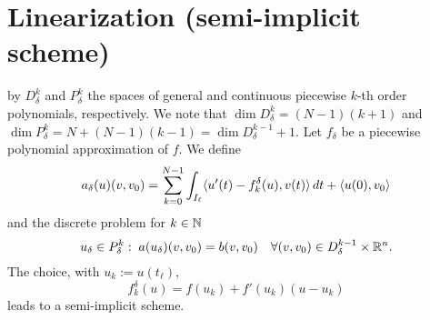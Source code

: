 \documentclass[english,12pt,a4paper]{article}
\begin{document}
%
%
\section{Linearization (semi-implicit scheme)}\label{sec:}
%

by $D^k_{\delta}$ and $P^k_{\delta}$ the spaces of general and continuous piecewise $k$-th order polynomials, respectively. We note that
$\dim D^k_{\delta} = (N-1)(k+1)$ and $\dim P^k_{\delta} = N + (N-1)(k-1) = \dim D^{k-1}_{\delta}+1$. 
%
Let $f_{\delta}$ be a piecewise polynomial approximation of $f$. We define
%
\begin{equation}\label{eq:}
a_{\delta}(u)(v,v_0) = \sum_{k=0}^{N-1}\int_{I_{\ell}}\langle u'(t) - f_k^{\delta}(u),v(t)\rangle\, dt + \langle u(0),v_0\rangle
\end{equation}
%
and the discrete problem for $k\in \mathbb N$ 
%
\begin{equation}\label{eq:weak_form_ap}
u_{\delta}\in P^k_{\delta}:\; a(u_{\delta})(v,v_0) = b(v,v_0)\quad \forall (v,v_0)\in D^{k-1}_{\delta}\times \mathbb R^n.
\end{equation}
%
The choice, with $u_k:=u(t_{\ell})$,
%
\begin{equation}\label{eq:}
f_k^{\delta}(u) = f(u_k) +  f'(u_k)(u-u_k)
\end{equation}
%
leads to a semi-implicit scheme.

%
\end{document}
